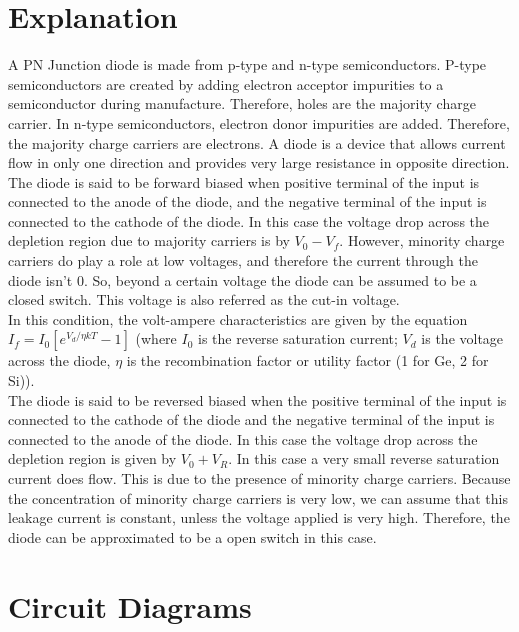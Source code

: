 \documentclass{article}
\begin{document}
	
	\section{Explanation}
	A PN Junction diode is made from p-type and n-type semiconductors. P-type semiconductors are created by adding electron acceptor impurities to a semiconductor during manufacture. Therefore, holes are the majority charge carrier. In n-type semiconductors, electron donor impurities are added. Therefore, the majority charge carriers are electrons. A diode is a device that allows current flow in only one direction and provides very large resistance in opposite direction. \\
	The diode is said to be forward biased when positive terminal of the input is connected to the anode of the diode, and the negative terminal of the input is connected to the cathode of the diode. In this case the voltage drop across the depletion region due to majority carriers is by $ V_0-V_f $. However, minority charge carriers do play a role at low voltages, and therefore the current through the diode isn't 0. So, beyond a certain voltage the diode can be assumed to be a closed switch. This voltage is also referred as the cut-in voltage. \\
	In this condition, the volt-ampere characteristics are given by the equation $ I_f = I_0[ e^{V_d/\eta k T} - 1] $ (where $ I_0 $ is the reverse saturation current; $ V_d $ is the voltage across the diode, $\eta$ is the recombination factor or utility factor (1 for Ge, 2 for Si)). \\
	The diode is said to be reversed biased when the positive terminal of the input is connected to the cathode of the diode and the negative terminal of the input is connected to the anode of the diode. In this case the voltage drop across the depletion region is given by $ V_0 + V_R $. In this case a very small reverse saturation current does flow. This is due to the presence of minority charge carriers. Because the concentration of minority charge carriers is very low, we can assume that this leakage current is constant, unless the voltage applied is very high. Therefore, the diode can be approximated to be a open switch in this case. \\
	
	\section{Circuit Diagrams}
\end{document}
